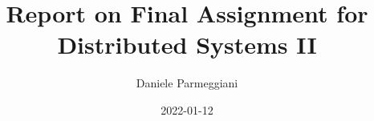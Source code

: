 \documentclass[]{ifacconf}
\begin{document}
\begin{frontmatter}
	\title{Report on Final Assignment for Distributed Systems II}
	\author{Daniele Parmeggiani}
	\date{2022-01-12}
\end{frontmatter}

\begin{abstract}

\end{abstract}

\section{}
\end{document}
